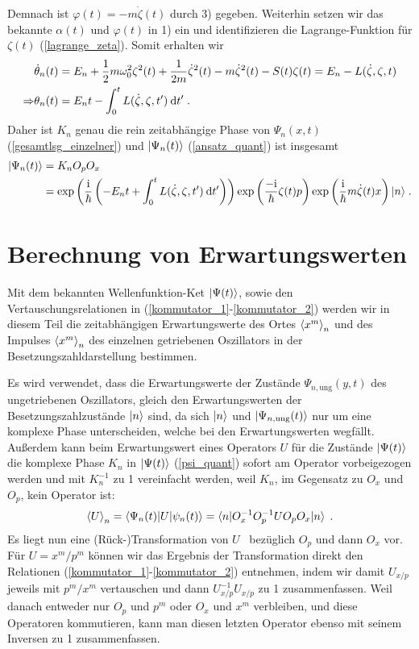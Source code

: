   Demnach ist $\varphi(t)=-m\dot\zeta(t)$ durch 3) gegeben.
  Weiterhin setzen wir das bekannte $\alpha(t)$ und $\varphi(t)$ in 1) ein und identifizieren die Lagrange-Funktion für $\zeta(t)$ (\ref{lagrange_zeta}). Somit erhalten wir
  \begin{align}
    &\dot\theta_n(t)=E_n+\frac{1}{2}m\omega_0^2\zeta^2(t)+\frac{1}{2m}\dot\zeta^2(t)-m\dot\zeta^2(t)-S(t)\zeta(t)
    =E_n-L(\dot\zeta,\zeta,t) \notag\\
    \Rightarrow &\theta_n(t)=E_nt-\int_0^tL(\dot\zeta,\zeta,t')\:\text dt' \;.
  \end{align}
  Daher ist $K_n$ genau die rein zeitabhängige Phase von $\Psi_n(x,t)$ (\ref{gesamtlsg_einzelner}) und $\lvert\Psi_n(t)\rangle$ (\ref{ansatz_quant}) ist insgesamt
  \begin{align}
    \lvert\Psi_n(t)\rangle&=K_nO_pO_x\notag\\
    &=\exp\left(\frac{\text i}{\hbar}\left(-E_nt+\int_0^tL(\dot\zeta,\zeta,t')\:\text dt'\right)\right)\exp\left(\frac{-\text i}{\hbar}\zeta(t)p\right)\exp\left(\frac{\text i}{\hbar}m\dot\zeta(t)x\right)\lvert n\rangle \; .
    \label{psi_quant}
  \end{align}



\section{Berechnung von Erwartungswerten}
  Mit dem bekannten Wellenfunktion-Ket $\lvert\Psi(t)\rangle$, sowie den Vertauschungsrelationen in (\ref{kommutator_1}-\ref{kommutator_2}) werden wir in diesem Teil die zeitabhängigen Erwartungswerte des Ortes $\braket{x^m}_n$ und des Impulses $\braket{x^m}_n$ des einzelnen getriebenen Oszillators in der Besetzungszahldarstellung bestimmen.

  Es wird verwendet, dass die Erwartungswerte der Zustände $\Psi_{n,\text{ung}}(y,t)$ des ungetriebenen Oszillators, gleich den Erwartungswerten der Besetzungszahlzustände $\lvert n\rangle$ sind, da sich $\lvert n\rangle$ und $\lvert\Psi_{n,\text{ung}}(t)\rangle$ nur um eine komplexe Phase unterscheiden, welche bei den Erwartungswerten wegfällt.
  Außerdem kann beim Erwartungswert eines Operators $U$ für die Zustände $\lvert\Psi(t)\rangle$ die komplexe Phase $K_n$ in $\lvert\Psi(t)\rangle$ (\ref{psi_quant}) sofort am Operator vorbeigezogen werden und mit $K_n^{-1}$ zu 1 vereinfacht werden, weil $K_n$, im Gegensatz zu $O_x$ und $O_p$, kein Operator ist:
  \begin{equation}
    \braket{U}_n=\braket{\Psi_n(t)|U|\psi_n(t)}=\braket{n|O_x^{-1}O_p^{-1}UO_pO_x|n} \;.
  \end{equation}
  Es liegt nun eine (Rück-)Transformation von $U$ \, bezüglich $O_p$ und dann $O_x$ vor.
  Für $U=x^m/p^m$ können wir das Ergebnis der Transformation direkt den Relationen (\ref{kommutator_1}-\ref{kommutator_2}) entnehmen, indem wir damit $U_{x/p}$ jeweils mit $p^m/x^m$ vertauschen und dann $U_{x/p}^{-1}U_{x/p}$ zu 1 zusammenfassen.
  Weil danach entweder nur $O_p$ und $p^m$ oder $O_x$ und $x^m$ verbleiben, und diese Operatoren kommutieren, kann man diesen letzten Operator ebenso mit seinem Inversen zu 1 zusammenfassen.

